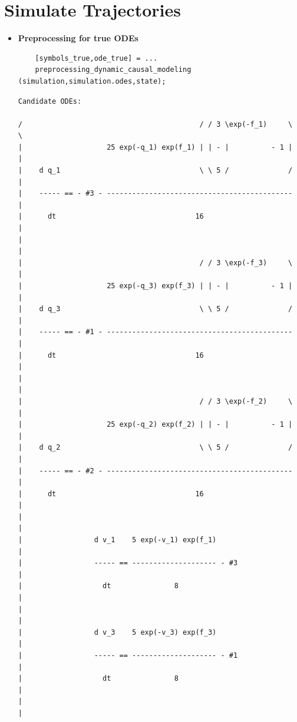 \section{Simulate Trajectories}
\vspace{1em}
\begin{itemize}
   \item \textbf{Preprocessing for true ODEs}

\color{RoyalPurple}\begin{verbatim}
    [symbols_true,ode_true] = ...
    preprocessing_dynamic_causal_modeling (simulation,simulation.odes,state);
\end{verbatim} 
\color{black}
{\small\centering
        \color{MidnightBlue} \begin{verbatim} 
Candidate ODEs:
 
/                                          / / 3 \exp(-f_1)     \   \
|                    25 exp(-q_1) exp(f_1) | | - |          - 1 |   |
|    d q_1                                 \ \ 5 /              /   |
|    ----- == - #3 - --------------------------------------------   |
|      dt                                 16                        |
|                                                                   |
|                                          / / 3 \exp(-f_3)     \   |
|                    25 exp(-q_3) exp(f_3) | | - |          - 1 |   |
|    d q_3                                 \ \ 5 /              /   |
|    ----- == - #1 - --------------------------------------------   |
|      dt                                 16                        |
|                                                                   |
|                                          / / 3 \exp(-f_2)     \   |
|                    25 exp(-q_2) exp(f_2) | | - |          - 1 |   |
|    d q_2                                 \ \ 5 /              /   |
|    ----- == - #2 - --------------------------------------------   |
|      dt                                 16                        |
|                                                                   |
|                 d v_1    5 exp(-v_1) exp(f_1)                     |
|                 ----- == -------------------- - #3                |
|                   dt               8                              |
|                                                                   |
|                 d v_3    5 exp(-v_3) exp(f_3)                     |
|                 ----- == -------------------- - #1                |
|                   dt               8                              |
|                                                                   |

\end{verbatim}}
\end{itemize}
